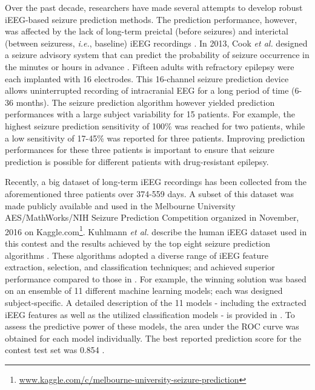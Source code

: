 \documentclass[journal]{IEEEtran}
\begin{document}
Over the past decade, researchers have made several attempts to develop robust iEEG-based seizure prediction methods. The prediction performance, however, was affected by the lack of long-term preictal (before seizures) and interictal (between seizuress, \textit{i.e.}, baseline) iEEG recordings \cite{mormann2006seizure, kuhlmann2010patient}. In 2013, Cook \textit{et al.} designed a seizure advisory system that can predict the probability of seizure occurrence in the minutes or hours in advance \cite{cook2013prediction}. Fifteen adults with refractory epilepsy were each implanted with 16 electrodes. This 16-channel seizure prediction device allows uninterrupted recording of intracranial EEG for a long period of time (6-36 months). The seizure prediction algorithm however yielded prediction performances with a large subject variability for 15 patients. For example, the highest seizure prediction sensitivity of 100\% was reached for two patients, while a low sensitivity of 17-45\% was reported for three patients. Improving prediction performances for these three patients is important to ensure that seizure prediction is possible for different patients with drug-resistant epilepsy. 



Recently, a big dataset of long-term iEEG recordings has been collected from the aforementioned three patients over 374-559 days. A subset of this dataset was made publicly available and used in the Melbourne University AES/MathWorks/NIH Seizure Prediction Competition organized in November, 2016 on Kaggle.com\footnote[1]{\href{https://www.kaggle.com/c/melbourne-university-seizure-prediction}{www.kaggle.com/c/melbourne-university-seizure-prediction}}. Kuhlmann \textit{et al.} describe the human iEEG dataset used in this contest and the results achieved by the top eight seizure prediction algorithms \cite{kuhlmann2018epilepsyecosystem}. These algorithms adopted a diverse range of iEEG feature extraction, selection, and classification techniques; and achieved superior performance compared to those in \cite{cook2013prediction}. For example, the winning solution was based on an ensemble of 11 different machine learning models; each was designed subject-specific. A detailed description of the 11 models - including the extracted iEEG features as well as the utilized classification models - is provided in \cite{WinningSolution}. To assess the predictive power of these models, the area under the ROC curve was obtained for each model individually. The best reported prediction score for the contest test set was 0.854 \cite{kuhlmann2018epilepsyecosystem, WinningSolution}.
\end{document}
